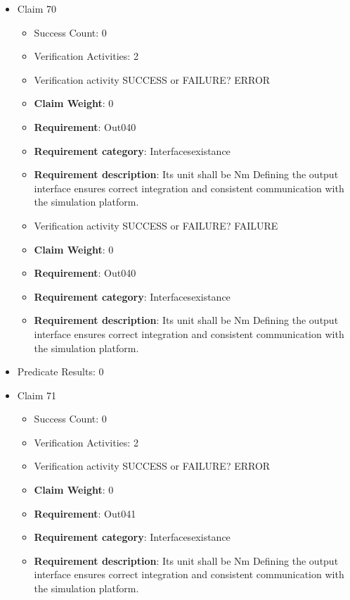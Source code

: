 \documentclass{article}
\begin{document}
\begin{itemize}
  				  \item Claim 70
				\begin{itemize}
			    	\item Success Count: 0 
			    	\item Verification Activities: 2
					\item Verification activity SUCCESS or FAILURE? ERROR
					\item \textbf{Claim Weight}: 0
						\item \textbf{Requirement}: Out040 
						\item \textbf{Requirement category}: Interfacesexistance 
						\item \textbf{Requirement description}: Its unit shall be Nm Defining the output interface ensures correct integration and consistent communication with the simulation platform.
					
					\item Verification activity SUCCESS or FAILURE? FAILURE
					\item \textbf{Claim Weight}: 0
						\item \textbf{Requirement}: Out040 
						\item \textbf{Requirement category}: Interfacesexistance 
						\item \textbf{Requirement description}: Its unit shall be Nm Defining the output interface ensures correct integration and consistent communication with the simulation platform.
					
				\end{itemize}
				
									    
				\item Predicate Results: 0

  				  \item Claim 71
				\begin{itemize}
			    	\item Success Count: 0 
			    	\item Verification Activities: 2
					\item Verification activity SUCCESS or FAILURE? ERROR
					\item \textbf{Claim Weight}: 0
						\item \textbf{Requirement}: Out041 
						\item \textbf{Requirement category}: Interfacesexistance 
						\item \textbf{Requirement description}: Its unit shall be Nm Defining the output interface ensures correct integration and consistent communication with the simulation platform.
					

\end{itemize}
\end{itemize}
\end{document}
